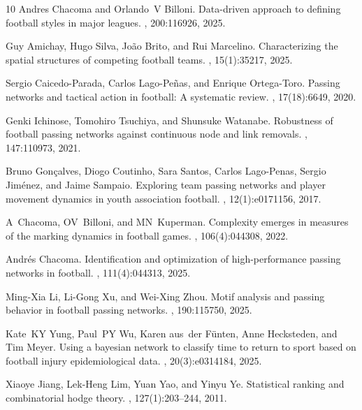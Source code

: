 \documentclass[preprint, amsmath,amssymb, pre]{revtex4-2}
\begin{document}
\begin{thebibliography}{10}
Andres Chacoma and Orlando~V Billoni.
\newblock Data-driven approach to defining football styles in major leagues.
, 200:116926, 2025.

Guy Amichay, Hugo Silva, Jo{\~a}o Brito, and Rui Marcelino.
\newblock Characterizing the spatial structures of competing football teams.
, 15(1):35217, 2025.

Sergio Caicedo-Parada, Carlos Lago-Pe{\~n}as, and Enrique Ortega-Toro.
\newblock Passing networks and tactical action in football: A systematic
  review.
, 17(18):6649, 2020.

Genki Ichinose, Tomohiro Tsuchiya, and Shunsuke Watanabe.
\newblock Robustness of football passing networks against continuous node and
  link removals.
, 147:110973, 2021.

Bruno Gon{\c{c}}alves, Diogo Coutinho, Sara Santos, Carlos Lago-Penas, Sergio
  Jim{\'e}nez, and Jaime Sampaio.
\newblock Exploring team passing networks and player movement dynamics in youth
  association football.
, 12(1):e0171156, 2017.

A~Chacoma, OV~Billoni, and MN~Kuperman.
\newblock Complexity emerges in measures of the marking dynamics in football
  games.
, 106(4):044308, 2022.

Andr{\'e}s Chacoma.
\newblock Identification and optimization of high-performance passing networks
  in football.
, 111(4):044313, 2025.

Ming-Xia Li, Li-Gong Xu, and Wei-Xing Zhou.
\newblock Motif analysis and passing behavior in football passing networks.
, 190:115750, 2025.

Kate~KY Yung, Paul~PY Wu, Karen aus~der F{\"u}nten, Anne Hecksteden, and Tim
  Meyer.
\newblock Using a bayesian network to classify time to return to sport based on
  football injury epidemiological data.
, 20(3):e0314184, 2025.

Xiaoye Jiang, Lek-Heng Lim, Yuan Yao, and Yinyu Ye.
\newblock Statistical ranking and combinatorial hodge theory.
, 127(1):203--244, 2011.


\end{thebibliography}
\end{document}
